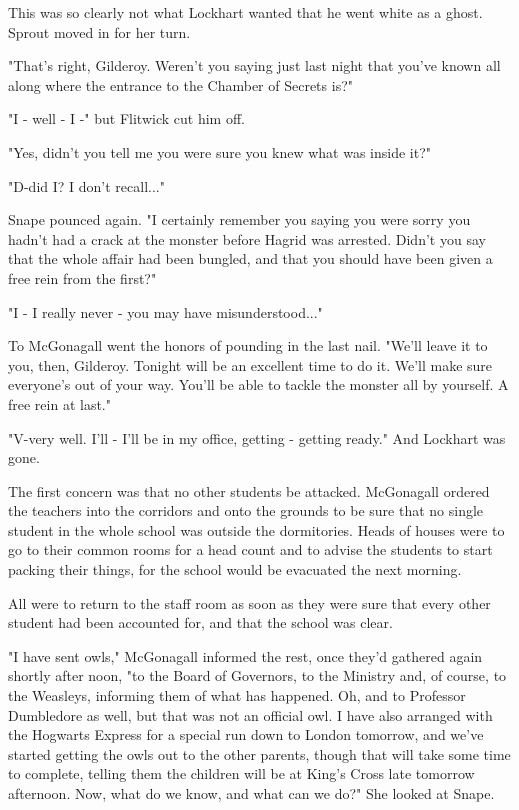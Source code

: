 \documentclass[a4paper,11pt]{article}
\begin{document}
This was so clearly not what Lockhart wanted that he went white as a ghost. Sprout moved in for her turn.

"That's right, Gilderoy. Weren't you saying just last night that you've known all along where the entrance to the Chamber of Secrets is?"

"I - well - I -" but Flitwick cut him off.

"Yes, didn't you tell me you were sure you knew what was inside it?"

"D-did I? I don't recall..."

Snape pounced again. "I certainly remember you saying you were sorry you hadn't had a crack at the monster before Hagrid was arrested. Didn't you say that the whole affair had been bungled, and that you should have been given a free rein from the first?"

"I - I really never - you may have misunderstood..."

To McGonagall went the honors of pounding in the last nail. "We'll leave it to you, then, Gilderoy. Tonight will be an excellent time to do it. We'll make sure everyone's out of your way. You'll be able to tackle the monster all by yourself. A free rein at last."

"V-very well. I'll - I'll be in my office, getting - getting ready." And Lockhart was gone.

The first concern was that no other students be attacked. McGonagall ordered the teachers into the corridors and onto the grounds to be sure that no single student in the whole school was outside the dormitories. Heads of houses were to go to their common rooms for a head count and to advise the students to start packing their things, for the school would be evacuated the next morning.

All were to return to the staff room as soon as they were sure that every other student had been accounted for, and that the school was clear.

"I have sent owls," McGonagall informed the rest, once they'd gathered again shortly after noon, "to the Board of Governors, to the Ministry and, of course, to the Weasleys, informing them of what has happened. Oh, and to Professor Dumbledore as well, but that was not an official owl. I have also arranged with the Hogwarts Express for a special run down to London tomorrow, and we've started getting the owls out to the other parents, though that will take some time to complete, telling them the children will be at King's Cross late tomorrow afternoon. Now, what do we know, and what can we do?" She looked at Snape.
\end{document}
